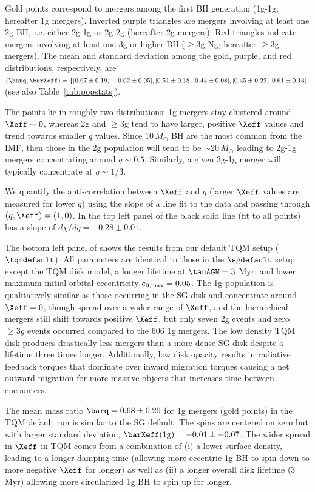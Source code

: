Gold points correspond to mergers among the first BH generation (1g-1g; hereafter 1g mergers).
Inverted purple triangles are mergers involving at least one 2g BH, i.e. either 2g-1g or 2g-2g (hereafter 2g mergers).
Red triangles indicate mergers involving at least one 3g or higher BH ($\geq$3g-Ng; hereafter $\geq$3g mergers).
The mean and standard deviation among the gold, purple, and red distributions, respectively, are $(\barq,\barXeff)=\{[0.67\pm 0.19,\ -0.02\pm 0.05], [0.51\pm 0.18,\ 0.44\pm 0.08], [0.45\pm 0.22,\ 0.61\pm 0.13]\}$ (see also Table~\ref{tab:popstats}).

The points lie in roughly two distributions: 1g mergers stay clustered around $\Xeff \sim 0$, whereas 2g and $\geq$3g tend to have larger, positive $\Xeff$ values and trend towards smaller $q$ values.
Since $10\,M_{\odot}$ BH are the most common from the IMF, then those in the 2g population will tend to be $\sim 20\,M_{\odot}$ leading to 2g-1g mergers concentrating around $q \sim 0.5$.
Similarly, a given 3g-1g merger will typically concentrate at $q \sim 1/3$.

We quantify the anti-correlation between $\Xeff$ and $q$ (larger $\Xeff$ values are measured for lower $q$) using the slope of a line fit to the data and passing through $(q,\Xeff)=(1,0)$.
In the top left panel of  the black solid line (fit to all points) has a slope of $d\chi/dq=-0.28\pm0.01$.

The bottom left panel of  shows the results from our default TQM setup ($\tqmdefault$).
All parameters are identical to those in the $\sgdefault$ setup except the TQM disk model, a longer lifetime at $\tauAGN=3$ Myr, and lower maximum initial orbital eccentricity $e_{\rm 0,max}=0.05$.
The 1g population is qualitatively similar as those occurring in the SG disk and concentrate around $\Xeff=0$, though spread over a wider range of $\Xeff$, and the hierarchical mergers still shift towards positive $\Xeff$, but only seven 2g events and zero $\geq3g$ events occurred compared to the 606 1g mergers.
The low density TQM disk produces drastically less mergers than a more dense SG disk despite a lifetime three times longer.
Additionally, low disk opacity results in radiative feedback torques that dominate over inward migration torques causing a net outward migration for more massive objects that increases time between encounters.

The mean mass ratio $\barq=0.68\pm0.20$ for 1g mergers (gold points) in the TQM default run is similar to the SG default.
The spins are centered on zero but with larger standard deviation, $\barXeff({\rm 1g})=-0.01\pm-0.07$.
The wider spread in $\Xeff$ in TQM comes from a combination of (i) a lower surface density, leading to a longer damping time (allowing more eccentric 1g BH to spin down to more negative $\Xeff$ for longer) as well as (ii) a longer overall disk lifetime (3 Myr) allowing more circularized 1g BH to spin up for longer.


